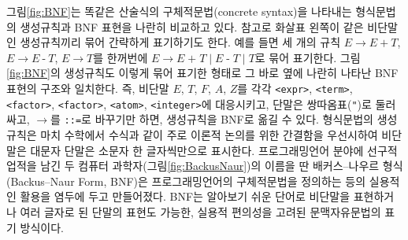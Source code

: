 \documentclass[b5paper,chapter,figtabcapt]{oblivoir}
\begin{document}
그림\;\ref{fig:BNF}는 똑같은 산술식의 구체적문법(concrete syntax)을
나타내는 형식문법의 생성규칙과 BNF 표현을 나란히 비교하고 있다.
참고로 화살표 왼쪽이 같은 비단말인 생성규칙끼리 묶어 간략하게 표기하기도 한다.
예를 들면 세 개의 규칙
$E \to E ~\texttt{+}~ T$, $E \to E ~\texttt{-}~ T$, $E \to T$를
한꺼번에 $E \to E\;\texttt{+}\;T \mid E\;\texttt{-}\;T \mid T$로
묶어 표기한다. 그림\;\ref{fig:BNF}의 생성규칙도 이렇게 묶어 표기한 형태로
그 바로 옆에 나란히 나타난 BNF 표현의 구조와 일치한다.
즉, 비단말 $E$, $T$, $F$, $A$, $Z$를 각각 \texttt{<expr>},
\texttt{<term>}, \texttt{<factor>}, \texttt{<factor>},
\texttt{<atom>}, \texttt{<integer>}에 대응시키고, 단말은
쌍따옴표(\texttt{"})로 둘러싸고, $\to$를 \texttt{::=}로
바꾸기만 하면, 생성규칙을 BNF로 옮길 수 있다. 형식문법의 생성규칙은
마치 수학에서 수식과 같이 주로 이론적 논의를 위한 간결함을 우선시하여
비단말은 대문자 단말은 소문자 한 글자씩만으로 표시한다.
프로그래밍언어 분야에 선구적 업적을 남긴
두 컴퓨터 과학자(그림\;\ref{fig:BackusNaur})의 이름을 딴
배커스--나우르 형식(Backus--Naur Form, BNF)은 프로그래밍언어의
구체적문법을 정의하는 등의 실용적인 활용을 염두에 두고 만들어졌다.
BNF는 알아보기 쉬운 단어로 비단말을 표현하거나 여러 글자로 된 단말의
표현도 가능한, 실용적 편의성을 고려된 문맥자유문법의 표기 방식이다.
\end{document}
